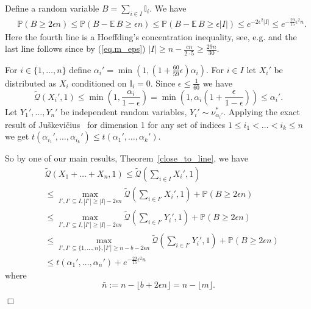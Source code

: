 \documentclass{article}
\newenvironment{proofof}[1]{\noindent {\bf Proof of #1}}{\hspace*{\fill}$\Box$}
\def\E{{\mathbb E}\,}
\newcommand{\pr}{\mathbb P}
\newcommand{\concdiam}{\tilde{\mathcal{Q}}}
\begin{document}
\begin{proofof}{Theorem~\ref{thm.main}}
    Define a random variable $B=\sum_{i \in I} \mathbb{I}_i$.
    We have
    \begin{align*}
        & \pr(B \ge 2 \epsilon n) 
\le \pr(B - \E B \ge \epsilon n)
\le \pr\left(B - \E B \ge \epsilon |I|\right)
\le e^{-2 \epsilon^2 |I| }
\le e^{- \frac {29 } {15} \epsilon^2 n}.
    \end{align*}
    Here
    the fourth line is a Hoeffding's concentration inequality, see, e.g. \cite{cmcd98} and
    the last line follows since by (\ref{eq.m_eps}) $|I| \ge n -  \frac {c n} {2 \cdot 5} \ge \frac {29 n} {30}$.

    For $i\in\{1,\dots,n\}$ define $\alpha_i' = \min(1,(1+\frac {60} {59} \epsilon) \alpha_i)$.
    For $i \in I$ let $X_i'$ be distributed as $X_i$ conditioned on $\mathbb{I}_i = 0$.
    Since $\epsilon \le \frac 1 {60}$ we have
    \[
        \concdiam(X_i', 1) \le  \min \left (1, \frac {\alpha_i} {1-\epsilon} \right) = \min \left (1, \alpha_i \left(1 + \frac{\epsilon} {1- \epsilon}\right) \right) \le \alpha_i'.
    \]
    Let $Y_1', \dots, Y_n'$ be independent random variables, $Y_i' \sim \nu^*_{\alpha_i'}$.
    Applying the exact result of Juškevičius~\cite{tj} for dimension 1 for any set of indices $1 \le i_1 <  \dots < i_k \le n$ we get
$t(\alpha_{i_1}', \dots, \alpha_{i_k}') \le t(\alpha_1', \dots, \alpha_k')$.


    So by one of our main results, Theorem~\ref{close_to_line}, we have
    \begin{align}
        & \concdiam(X_1 + \dots + X_n, 1) \le  \concdiam (\sum_{i \in I} X_i',1) \nonumber
        \\ & \le \max_{I', I' \subseteq I, |I'| \ge |I| - 2 \epsilon n} \concdiam (\sum_{i \in I'} X_i',1) + \pr( B \ge 2\epsilon n) \nonumber
        \\ & \le \max_{I', I' \subseteq I, |I'| \ge |I| - 2 \epsilon n} \concdiam (\sum_{i \in I'} Y_i',1) + \pr( B \ge 2\epsilon n) \nonumber
        \\ & \le \max_{I', I' \subseteq \{1, \dots, n\}, |I'| \ge n-b -2 \epsilon n} \concdiam (\sum_{i \in I'} Y_i',1) + \pr( B \ge 2\epsilon n) \nonumber
        \\ & \le t(\alpha_1', \dots, \alpha_{\bar{n}}') + e^{-\frac {29} {15} \epsilon^2 n} \label{eq.apply_close_to_line}
\end{align}
    where
    \[
       \bar{n} := n-\lfloor b + 2\epsilon n\rfloor = n - \lfloor m \rfloor.
    \]





\end{proofof}
\end{document}
